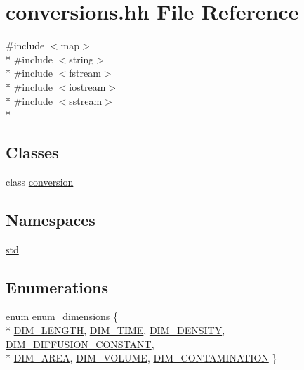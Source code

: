 \hypertarget{conversions_8hh}{\section{conversions.\-hh File Reference}
\label{conversions_8hh}
}
{\ttfamily \#include $<$map$>$}\\*
{\ttfamily \#include $<$string$>$}\\*
{\ttfamily \#include $<$fstream$>$}\\*
{\ttfamily \#include $<$iostream$>$}\\*
{\ttfamily \#include $<$sstream$>$}\\*
\subsection*{Classes}
\begin{DoxyCompactItemize}
\item 
class \hyperlink{classconversion}{conversion}
\end{DoxyCompactItemize}
\subsection*{Namespaces}
\begin{DoxyCompactItemize}
\item 
\hyperlink{namespacestd}{std}
\end{DoxyCompactItemize}
\subsection*{Enumerations}
\begin{DoxyCompactItemize}
\item 
enum \hyperlink{conversions_8hh_a1218b94f6f10bf510066fee10d610464}{enum\-\_\-dimensions} \{ \\*
\hyperlink{conversions_8hh_a1218b94f6f10bf510066fee10d610464a451c9349aed8f81d728376610e82cf04}{D\-I\-M\-\_\-\-L\-E\-N\-G\-T\-H}, 
\hyperlink{conversions_8hh_a1218b94f6f10bf510066fee10d610464ad64dbab5cd609f7d04a32fbf7a5d16a0}{D\-I\-M\-\_\-\-T\-I\-M\-E}, 
\hyperlink{conversions_8hh_a1218b94f6f10bf510066fee10d610464a5e94b061054683fef4e20a48def8352c}{D\-I\-M\-\_\-\-D\-E\-N\-S\-I\-T\-Y}, 
\hyperlink{conversions_8hh_a1218b94f6f10bf510066fee10d610464af8191d1e9834e92c31f2c90517ff781c}{D\-I\-M\-\_\-\-D\-I\-F\-F\-U\-S\-I\-O\-N\-\_\-\-C\-O\-N\-S\-T\-A\-N\-T}, 
\\*
\hyperlink{conversions_8hh_a1218b94f6f10bf510066fee10d610464aa9037e32fcf7a80c5bd71f230ab5046b}{D\-I\-M\-\_\-\-A\-R\-E\-A}, 
\hyperlink{conversions_8hh_a1218b94f6f10bf510066fee10d610464a8e6b0d491586d67b94a25f5349efe259}{D\-I\-M\-\_\-\-V\-O\-L\-U\-M\-E}, 
\hyperlink{conversions_8hh_a1218b94f6f10bf510066fee10d610464ab7f295d8fd1b2b91c22eba5c7e83bbea}{D\-I\-M\-\_\-\-C\-O\-N\-T\-A\-M\-I\-N\-A\-T\-I\-O\-N}
 \}
\end{DoxyCompactItemize}


